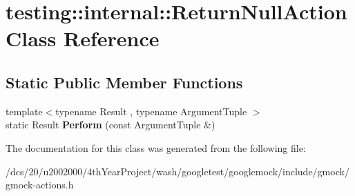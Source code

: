 \hypertarget{classtesting_1_1internal_1_1ReturnNullAction}{}\section{testing\+:\+:internal\+:\+:Return\+Null\+Action Class Reference}
\label{classtesting_1_1internal_1_1ReturnNullAction}
\subsection*{Static Public Member Functions}
\begin{DoxyCompactItemize}
\item 
\mbox{\label{classtesting_1_1internal_1_1ReturnNullAction_a6ce1fba236686df93070320b399e4f32}} 
{\footnotesize template$<$typename Result , typename Argument\+Tuple $>$ }\\static Result {\bfseries Perform} (const Argument\+Tuple \&)
\end{DoxyCompactItemize}


The documentation for this class was generated from the following file\+:\begin{DoxyCompactItemize}
\item 
/dcs/20/u2002000/4th\+Year\+Project/wash/googletest/googlemock/include/gmock/gmock-\/actions.\+h\end{DoxyCompactItemize}
